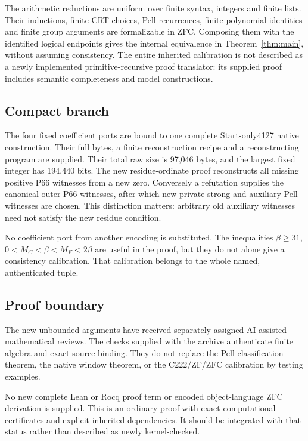\documentclass[11pt]{article}
\begin{document}
The arithmetic reductions are uniform over finite syntax, integers and
finite lists. Their inductions, finite CRT choices, Pell recurrences,
finite polynomial identities and finite group arguments are formalizable
in ZFC. Composing them with the identified logical endpoints gives the
internal equivalence in Theorem~\ref{thm:main}, without assuming consistency.
The entire inherited calibration is not described as a newly implemented
primitive-recursive proof translator: its supplied proof includes
semantic completeness and model constructions.

\subsection{Compact branch}

The four fixed coefficient ports are bound to one complete Start-only4127
native construction. Their full bytes, a finite reconstruction recipe
and a reconstructing program are supplied. Their total raw size is
97,046 bytes, and the largest fixed integer has 194,440 bits.
The new residue-ordinate proof reconstructs all missing positive P66
witnesses from a new zero. Conversely a refutation supplies the canonical
outer P66 witnesses, after which new private strong and auxiliary Pell
witnesses are chosen. This distinction matters: arbitrary old auxiliary
witnesses need not satisfy the new residue condition.

No coefficient port from another encoding is substituted.
The inequalities $\beta\ge31$, $0<M_C<\beta<M_F<2\beta$ are useful in
the proof, but they do not alone give a consistency calibration.
That calibration belongs to the whole named, authenticated tuple.

\subsection{Proof boundary}

The new unbounded arguments have received separately assigned
AI-assisted mathematical reviews. The checks supplied with the archive
authenticate finite algebra and exact source binding. They do not replace
the Pell classification theorem, the native window theorem, or the
C222/ZF/ZFC calibration by testing examples.

No new complete Lean or Rocq proof term or encoded object-language ZFC
derivation is supplied. This is an ordinary proof with exact computational
certificates and explicit inherited dependencies. It should be integrated
with that status rather than described as newly kernel-checked.
\end{document}
